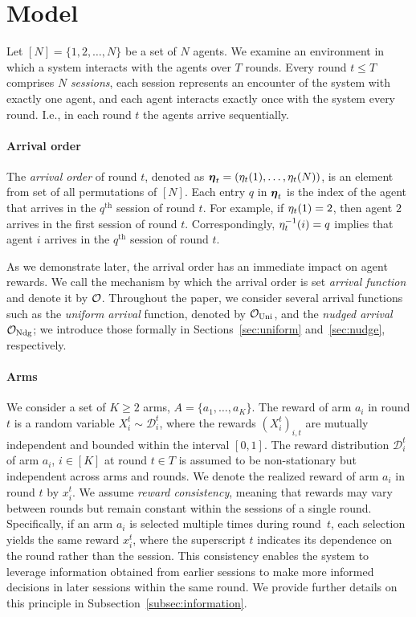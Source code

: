 \section{Model}
\label{sec:model}
Let $[N] = \{1, 2, \dots, N \}$ be a set of $N$ agents.
We examine an environment in which a system interacts with the agents over $T$ rounds.
Every round $t\leq T$ comprises $N$ \emph{sessions}, each session represents an encounter of the system with exactly one agent, and each agent interacts exactly once with the system every round.
I.e., in each round $t$ the agents arrive sequentially. 


\paragraph{Arrival order} The \emph{arrival order} of round $t$, denoted as $\boldsymbol{\eta}_t=(\eta_t(1),\dots, \eta_t(N))$, is an element from set of all permutations of $[N]$. Each entry $q$ in $\boldsymbol{\eta}_t$ is the index of the agent that arrives in the $q^{\text{th}}$ session of round $t$.
For example, if $\eta_t(1) = 2$, then agent $2$ arrives in the first session of round $t$.
Correspondingly, $\eta_t^{-1}(i)=q$ implies that agent $i$ arrives in the $q^{\text{th}}$ session of round $t$. 

As we demonstrate later, the arrival order has an immediate impact on agent rewards. We call the mechanism by which the arrival order is set \emph{arrival function} and denote it by $\mathcal O$. Throughout the paper, we consider several arrival functions such as the \emph{uniform arrival} function, denoted by $\mathcal O_{\textnormal{Uni}}$, and the \emph{nudged arrival} $\mathcal O_{\textnormal{Ndg}}$; we introduce those formally in Sections~\ref{sec:uniform} and~\ref{sec:nudge}, respectively.



\paragraph{Arms} We consider a set of $K \geq 2$ arms, $A = \{a_1, \ldots, a_K\}$. The reward of arm $a_i$ in round $t$ is a random variable $X_i^t \sim \mathcal{D}^t_i$, where the rewards $(X_i^t)_{i,t}$ are mutually independent and bounded within the interval $[0,1]$. The reward distribution $\mathcal{D}^t_i$ of arm $a_i$, $i\in [K]$ at round $t\in T$ is assumed to be non-stationary but independent across arms and rounds. We denote the realized reward of arm $a_i$ in round $t$ by $x_i^t$. We assume \emph{reward consistency}, meaning that rewards may vary between rounds but remain constant within the sessions of a single round. Specifically, if an arm $a_i$ is selected multiple times during round~$t$, each selection yields the same reward $x_i^t$, where the superscript $t$ indicates its dependence on the round rather than the session. This consistency enables the system to leverage information obtained from earlier sessions to make more informed decisions in later sessions within the same round. We provide further details on this principle in Subsection~\ref{subsec:information}.


